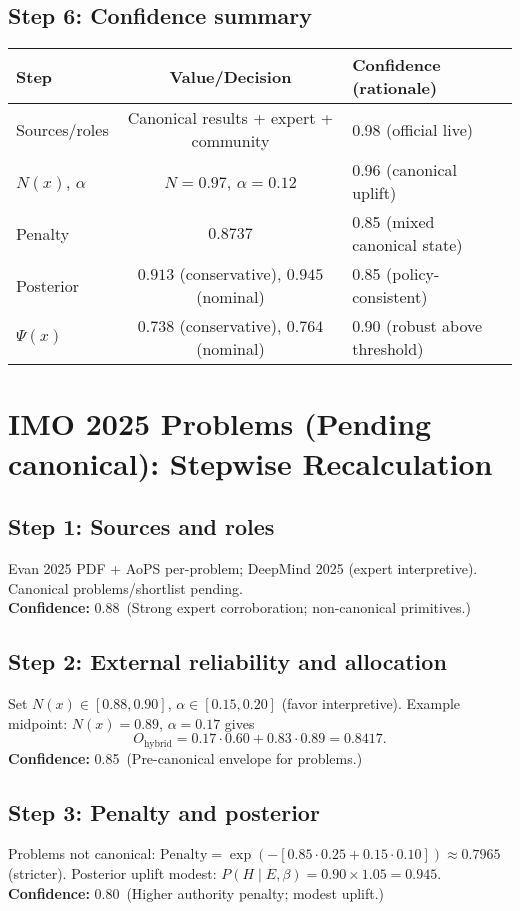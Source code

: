 \documentclass[11pt]{article}
\newcommand{\Nx}{N(x)}
\newcommand{\Px}{\Psi(x)}
\newcommand{\post}{P(H\mid E,\beta)}
\newcommand{\pen}{\mathrm{Penalty}}
\newcommand{\conf}[2]{\textbf{Confidence:} #1\ (#2)}
\begin{document}
\subsection*{Step 6: Confidence summary}
\begin{center}
\renewcommand{\arraystretch}{1.12}
\begin{tabular}{@{}lcl@{}}
\toprule
Step & Value/Decision & Confidence (rationale)\\
\midrule
Sources/roles & Canonical results + expert + community & 0.98 (official live)\\
$N(x)$, $\alpha$ & $N=0.97$, $\alpha=0.12$ & 0.96 (canonical uplift)\\
Penalty & $0.8737$ & 0.85 (mixed canonical state)\\
Posterior & $0.913$ (conservative), $0.945$ (nominal) & 0.85 (policy-consistent)\\
$\Px$ & $0.738$ (conservative), $0.764$ (nominal) & 0.90 (robust above threshold)\\
\bottomrule
\end{tabular}
\end{center}

\section{IMO 2025 Problems (Pending canonical): Stepwise Recalculation}
\subsection*{Step 1: Sources and roles}
Evan 2025 PDF + AoPS per-problem; DeepMind 2025 (expert interpretive). Canonical problems/shortlist pending.\\
\conf{0.88}{Strong expert corroboration; non-canonical primitives.}

\subsection*{Step 2: External reliability and allocation}
Set $\Nx\in[0.88,0.90]$, $\alpha\in[0.15,0.20]$ (favor interpretive). Example midpoint: $\Nx=0.89$, $\alpha=0.17$ gives
\[
O_{\text{hybrid}}=0.17\cdot 0.60 + 0.83\cdot 0.89=0.8417.
\]
\conf{0.85}{Pre-canonical envelope for problems.}

\subsection*{Step 3: Penalty and posterior}
Problems not canonical: $\pen=\exp(-[0.85\cdot 0.25+0.15\cdot 0.10])\approx 0.7965$ (stricter). Posterior uplift modest: $\post=0.90\times 1.05=0.945$.\\
\conf{0.80}{Higher authority penalty; modest uplift.}
\end{document}
